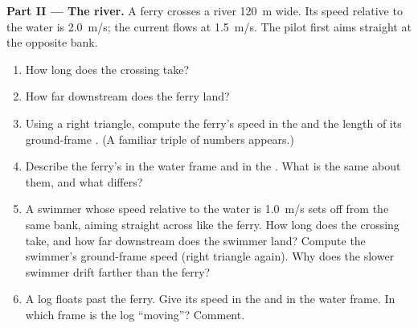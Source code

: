 \begin{problem}
\medskip
\noindent\textbf{Part II --- The river.}
A ferry crosses a river \qty{120}{m} wide. Its speed relative to the
water is \qty{2.0}{m/s}; the current flows at \qty{1.5}{m/s}. The pilot
first aims straight at the opposite bank.
\begin{enumerate}[resume]
  \item How long does the crossing take?
  \item How far downstream does the ferry land?
  \item Using a right triangle, compute the ferry's speed in the  and the length of its ground-frame . (A
        familiar triple of numbers appears.)
  \item Describe the ferry's  in the water frame and in the
        . What is the same about them, and what differs?
  \item A swimmer whose speed relative to the water is \qty{1.0}{m/s}
        sets off from the same bank, aiming straight across like the
        ferry. How long does the crossing take, and how far downstream
        does the swimmer land? Compute the swimmer's ground-frame
        speed (right triangle again). Why does the slower swimmer
        drift farther than the ferry?
  \item A log floats past the ferry. Give its speed in the 
        and in the water frame. In which frame is the log ``moving''?
        Comment.
\end{enumerate}


\end{problem}
